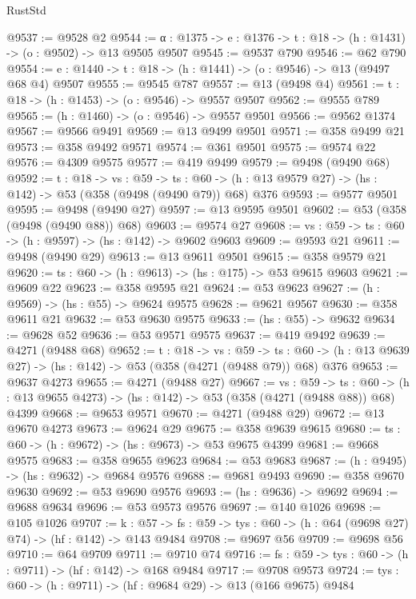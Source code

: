 \begin{lexlean}{RustStd}
\begin{coremodule}
@9537 := @9528 @2
@9544 := {α : @1375} -> {e : @1376} -> {t : @18} -> (h : @1431) -> (o : @9502) -> @13 @9505 @9507
@9545 := @9537 @790
@9546 := @62 @790
@9554 := {e : @1440} -> {t : @18} -> (h : @1441) -> (o : @9546) -> @13 (@9497 @68 @4) @9507
@9555 := @9545 @787
@9557 := @13 (@9498 @4)
@9561 := {t : @18} -> (h : @1453) -> (o : @9546) -> @9557 @9507
@9562 := @9555 @789
@9565 := (h : @1460) -> (o : @9546) -> @9557 @9501
@9566 := @9562 @1374
@9567 := @9566 @9491
@9569 := @13 @9499 @9501
@9571 := @358 @9499 @21
@9573 := @358 @9492 @9571
@9574 := @361 @9501
@9575 := @9574 @22
@9576 := @4309 @9575
@9577 := @419 @9499
@9579 := @9498 (@9490 @68)
@9592 := {t : @18} ->
  {vs : @59} ->
  {ts : @60} -> (h : @13 @9579 @27) -> (hs : @142) -> @53 (@358 (@9498 (@9490 @79)) @68) @376
@9593 := @9577 @9501
@9595 := @9498 (@9490 @27)
@9597 := @13 @9595 @9501
@9602 := @53 (@358 (@9498 (@9490 @88)) @68)
@9603 := @9574 @27
@9608 := {vs : @59} -> {ts : @60} -> (h : @9597) -> (hs : @142) -> @9602 @9603
@9609 := @9593 @21
@9611 := @9498 (@9490 @29)
@9613 := @13 @9611 @9501
@9615 := @358 @9579 @21
@9620 := {ts : @60} -> (h : @9613) -> (hs : @175) -> @53 @9615 @9603
@9621 := @9609 @22
@9623 := @358 @9595 @21
@9624 := @53 @9623
@9627 := (h : @9569) -> (hs : @55) -> @9624 @9575
@9628 := @9621 @9567
@9630 := @358 @9611 @21
@9632 := @53 @9630 @9575
@9633 := (hs : @55) -> @9632
@9634 := @9628 @52
@9636 := @53 @9571 @9575
@9637 := @419 @9492
@9639 := @4271 (@9488 @68)
@9652 := {t : @18} ->
  {vs : @59} ->
  {ts : @60} -> (h : @13 @9639 @27) -> (hs : @142) -> @53 (@358 (@4271 (@9488 @79)) @68) @376
@9653 := @9637 @4273
@9655 := @4271 (@9488 @27)
@9667 := {vs : @59} ->
  {ts : @60} -> (h : @13 @9655 @4273) -> (hs : @142) -> @53 (@358 (@4271 (@9488 @88)) @68) @4399
@9668 := @9653 @9571
@9670 := @4271 (@9488 @29)
@9672 := @13 @9670 @4273
@9673 := @9624 @29
@9675 := @358 @9639 @9615
@9680 := {ts : @60} -> (h : @9672) -> (hs : @9673) -> @53 @9675 @4399
@9681 := @9668 @9575
@9683 := @358 @9655 @9623
@9684 := @53 @9683
@9687 := (h : @9495) -> (hs : @9632) -> @9684 @9576
@9688 := @9681 @9493
@9690 := @358 @9670 @9630
@9692 := @53 @9690 @9576
@9693 := (hs : @9636) -> @9692
@9694 := @9688 @9634
@9696 := @53 @9573 @9576
@9697 := @140 @1026
@9698 := @105 @1026
@9707 := {k : @57} ->
  {fs : @59} -> {tys : @60} -> (h : @64 (@9698 @27) @74) -> (hf : @142) -> @143 @9484
@9708 := @9697 @56
@9709 := @9698 @56
@9710 := @64 @9709
@9711 := @9710 @74
@9716 := {fs : @59} -> {tys : @60} -> (h : @9711) -> (hf : @142) -> @168 @9484
@9717 := @9708 @9573
@9724 := {tys : @60} -> (h : @9711) -> (hf : @9684 @29) -> @13 (@166 @9675) @9484

\end{coremodule}
\end{lexlean}
